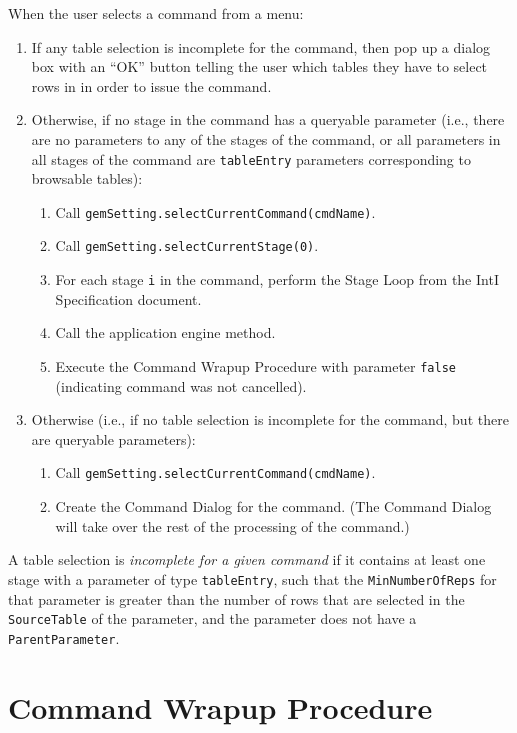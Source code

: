 \documentclass[11pt]{article}
\begin{document}
When the user selects a command from a menu:
\begin{enumerate}
\item If any table selection is incomplete for the command,
  then pop up a dialog box with an ``OK'' button telling the user
  which tables they have to select rows in in order to issue the
  command.
\item Otherwise, if no stage in the command has a queryable parameter
  (i.e., there are no parameters to any of the stages of the command, or all
  parameters in all stages of the command are
  {\tt tableEntry} parameters corresponding to browsable tables):
  \begin{enumerate}
  \item Call {\tt gemSetting.selectCurrentCommand(cmdName)}.
  \item Call {\tt gemSetting.selectCurrentStage(0)}.
  \item For each stage \verb/i/ in the command, perform the Stage Loop
    from the IntI Specification document.
  \item Call the application engine method.
  \item Execute the Command Wrapup Procedure with parameter {\tt false}
    (indicating command was not cancelled).
  \end{enumerate}
\item Otherwise (i.e., if no table selection is incomplete for
  the command, but there are queryable parameters):
  \begin{enumerate}
  \item Call {\tt gemSetting.selectCurrentCommand(cmdName)}.
  \item Create the Command Dialog for the command.
    (The Command Dialog will take over the rest of the processing
    of the command.)
  \end{enumerate}
\end{enumerate}
A table selection is {\it incomplete for a given command}
if it contains at least one stage with a parameter of type
{\tt tableEntry}, such that the {\tt MinNumberOfReps} for that
parameter is greater than the number of rows that are selected
in the {\tt SourceTable} of the parameter, and the parameter
does not have a {\tt ParentParameter}.

\section{Command Wrapup Procedure}
\end{document}
